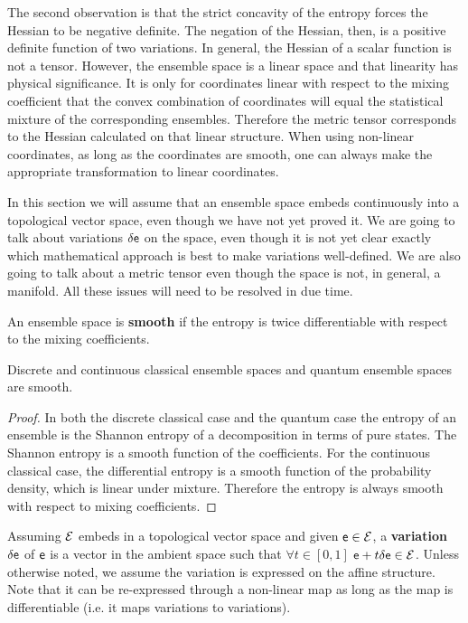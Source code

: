 The second observation is that the strict concavity of the entropy forces the Hessian to be negative definite. The negation of the Hessian, then, is a positive definite function of two variations. In general, the Hessian of a scalar function is not a tensor. However, the ensemble space is a linear space and that linearity has physical significance. It is only for coordinates linear with respect to the mixing coefficient that the convex combination of coordinates will equal the statistical mixture of the corresponding ensembles. Therefore the metric tensor corresponds to the Hessian calculated on that linear structure. When using non-linear coordinates, as long as the coordinates are smooth, one can always make the appropriate transformation to linear coordinates.

\begin{mathSection}
\begin{remark}
	In this section we will assume that an ensemble space embeds continuously into a topological vector space, even though we have not yet proved it. We are going to talk about variations $\delta \mathsf{e}$ on the space, even though it is not yet clear exactly which mathematical approach is best to make variations well-defined. We are also going to talk about a metric tensor even though the space is not, in general, a manifold. All these issues will need to be resolved in due time.
\end{remark}
	
\begin{defn}
	An ensemble space is \textbf{smooth} if the entropy is twice differentiable with respect to the mixing coefficients.
\end{defn}

\begin{prop}
	Discrete and continuous classical ensemble spaces and quantum ensemble spaces are smooth.
\end{prop}

\begin{proof}
	In both the discrete classical case and the quantum case the entropy of an ensemble is the Shannon entropy of a decomposition in terms of pure states. The Shannon entropy is a smooth function of the coefficients. For the continuous classical case, the differential entropy is a smooth function of the probability density, which is linear under mixture. Therefore the entropy is always smooth with respect to mixing coefficients.
\end{proof}

\begin{defn}
	Assuming $\mathcal{E}$ embeds in a topological vector space and given $\mathsf{e} \in \mathcal{E}$, a \textbf{variation} $\delta \mathsf{e}$ of $\mathsf{e}$ is a vector in the ambient space such that $\forall t \in [0,1]$ $\mathsf{e} + t \delta \mathsf{e} \in \mathcal{E}$. Unless otherwise noted, we assume the variation is expressed on the affine structure. Note that it can be re-expressed through a non-linear map as long as the map is differentiable (i.e. it maps variations to variations).
\end{defn}


\end{mathSection}
